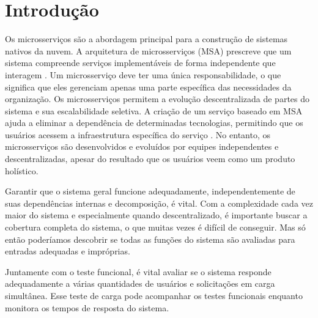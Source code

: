 
\section{Introdução} \label{sec:Introdução}

Os microsserviços são a abordagem principal para a construção de sistemas nativos da nuvem. A arquitetura de microsserviços (MSA) prescreve que um sistema compreende serviços implementáveis de forma independente que interagem
\cite{lewis2014microservices}. Um microsserviço deve ter uma única responsabilidade, o que significa que eles gerenciam apenas uma parte específica das necessidades da organização. Os microsserviços permitem a evolução descentralizada de partes do sistema e sua escalabilidade seletiva.
A criação de um serviço baseado em MSA ajuda a eliminar a dependência de determinadas tecnologias, permitindo que os usuários acessem a infraestrutura específica do serviço \cite{cerny2018contextual}. No entanto, os microsserviços são desenvolvidos e evoluídos por equipes independentes e descentralizadas, apesar do resultado que os usuários veem como um produto holístico.

Garantir que o sistema geral funcione adequadamente, independentemente de suas dependências internas e decomposição, é vital. Com a complexidade cada vez maior do sistema e especialmente quando descentralizado, é importante buscar a cobertura completa do sistema, o que muitas vezes é difícil de conseguir. Mas só então poderíamos descobrir se todas as funções do sistema são avaliadas para entradas adequadas e impróprias.

Juntamente com o teste funcional, é vital avaliar se o sistema responde adequadamente a várias quantidades de usuários e solicitações em carga simultânea. Esse teste de carga pode acompanhar os testes funcionais enquanto monitora os tempos de resposta do sistema.


